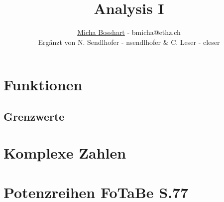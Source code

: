 \documentclass[8pt]{mpscheatsheet}
\author{\href{https://n.ethz.ch/\~bmicha}{Micha Bosshart} - bmicha@ethz.ch\\\footnotesize Ergänzt von N. Sendlhofer - nsendlhofer \& C. Leser - cleser}
\title{Analysis I}
\begin{document}
    \section{Funktionen}
        
        \subsection{Grenzwerte}
        
        
        
        
        
    \section{Komplexe Zahlen}
        
        
        
    \section{Potenzreihen \texorpdfstring{\hfill FoTaBe S.77}{ - FoTaBe S.77}}
        
        
        

        \newpage
\end{document}
